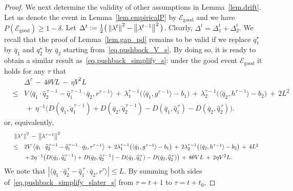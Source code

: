 \documentclass[12pt, final]{l4dc2023}
\begin{document}
\begin{proof}
	We next determine the validity of other assumptions in Lemma~\ref{lem.drift}. Let us denote the event in Lemma~\ref{lem.empiricalP} by $\mathcal{E}_{\text{good}}$ and we have $P(\mathcal{E}_{\text{good}})\geq 1-\delta$. Let $\Delta^t \mathrel{\mathop:}= \frac{1}{2} \big( \left\|{\lambda^t}\right\|^2-\left\|{\lambda^{t-1}}\right\|^2 \big)$. Clearly, $\Delta^t = \Delta_1^t+\Delta_2^t$. 
	We recall that the proof of Lemma~\ref{lem.gap_pd} remains to be valid if we replace $q_1^\star$ by $\bar q_1$ and $q_2^\star$ by $\bar q_2$ starting from~\eqref{eq.pushback_V_s}. By doing so, it is ready to obtain a similar result as~\eqref{eq.pushback_simplify_s}: under the good event $\mathcal{E}_{\text{good}}$ it holds for any $\tau$ that
	\[
	\begin{array}{rcl}
	&& \!\!\!\! \!\!\!\! \!\! 
	\Delta^{\tau} \,-\,4\theta V L\,-\,\eta V^2 L
	\\[0.2cm]
	& \leq & V\, \big\langle{ \bar q_1\cdot \hat q_2^{\,\tau-1}-\hat q_1^{\,\tau-1}\cdot \bar q_2 },{r^{\tau-1}}\big\rangle 
	\,+\,
	\lambda_1^{\tau-1} \big(\langle{ \bar q_1},{g^{\tau-1}}\rangle 
	-b_1\big)
	\,+\,
	\lambda_2^{\tau-1} \big( \langle{ \bar q_2},{h^{\tau-1}}\rangle -b_2\big)
	\,+\,2L^2
	\\[0.2cm]
	&& \,+\, \eta^{-1} \big(D(\bar q_1,\tilde q_1^{\,\tau-1}) + D( \bar q_2, \tilde q_2^{\,\tau-1}) -D( \bar q_1,\hat q_1^{\,\tau}) - D( \bar q_2, \hat q_2^{\,\tau}) \big).
	\end{array}
	\]
	or, equivalently,
	\begin{equation}\label{eq.pushback_simplify_slater_s}
	\begin{array}{rcl}
	&& \!\!\!\! \!\!\!\! \!\! 
	\norm{\lambda^\tau}^2 \,-\, \norm{\lambda^{\tau-1}}^2
	\\[0.2cm]
	&\leq& 2V\, \big\langle{ \bar q_1\cdot \hat q_2^{\,\tau-1}-\hat q_1^{\,\tau-1}\cdot \bar q_2 },{r^{\tau-1}}\big\rangle 
	\,+\,
	2\lambda_1^{\tau-1} \big(\langle{ \bar q_1},{g^{\tau-1}}\rangle 
	-b_1\big)
	\,+\,
	2\lambda_2^{\tau-1} \big(
	\langle{ \bar q_2},{h^{\tau-1}}\rangle -b_2\big)
	\,+\,4L^2
	\\[0.2cm]
	&& \,+\, 2\eta^{-1} \big(D(\bar q_1,\tilde q_1^{\,\tau-1}) + D( \bar q_2, \tilde q_2^{\,\tau-1}) -D( \bar q_1,\hat q_1^{\,\tau}) - D( \bar q_2, \hat q_2^{\,\tau}) \big)
	\,+\,8\theta V L\,+\,2\eta V^2 L.
	\end{array}
	\end{equation}
	We note that $ |\langle{ \bar q_1\cdot \hat q_2^{\,\tau}-\hat q_1^{\,\tau}\cdot \bar q_2 },{r^{\tau}}\rangle|\leq L$. By summing both sides of~\eqref{eq.pushback_simplify_slater_s} from $\tau=t+1$ to $\tau=t+t_0$,

\end{proof}
\end{document}
